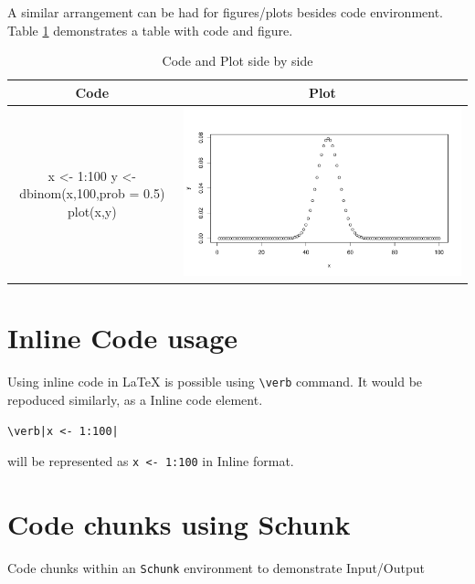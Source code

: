 A similar arrangement can be had for figures/plots besides code environment.
Table \ref{table:3} demonstrates a table with code and figure.
\begin{table}[htbp]
  \centering
  \begin{tabular}{| c | c |}
  \hline
  Code & Plot\\
    \hline
    \begin{minipage}{0.45\textwidth}
\vspace{1mm}
\begin{example}
x <- 1:100
y <- dbinom(x,100,prob = 0.5)
plot(x,y)
\end{example}
    \end{minipage} &
    \begin{minipage}{0.45\textwidth}
    \centering
    \includegraphics[width=1\textwidth]{binom}
    \end{minipage}\\
    \hline
  \end{tabular}
  \caption{Code and Plot side by side}
  \label{table:3}
\end{table}


\section{Inline Code usage}

Using inline code in LaTeX is possible using \verb|\verb| command.
It would be repoduced similarly, as a Inline code element.
\begin{verbatim}
\verb|x <- 1:100|
\end{verbatim}
will be represented as \verb|x <- 1:100| in Inline format.

\section{Code chunks using Schunk}
Code chunks within an \verb|Schunk| environment to demonstrate Input/Output

